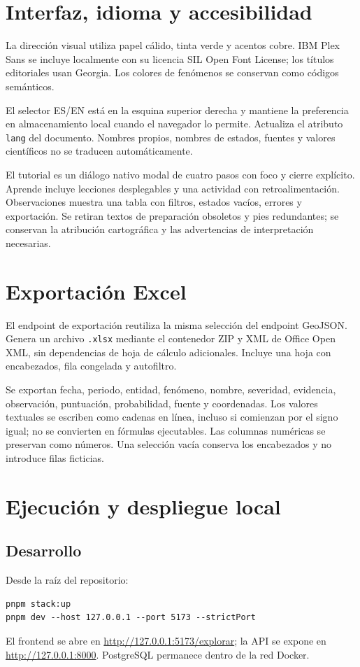 \documentclass[11pt,a4paper]{article}
\begin{document}
\section{Interfaz, idioma y accesibilidad}
La dirección visual utiliza papel cálido, tinta verde y acentos cobre. IBM Plex Sans se incluye localmente con su licencia SIL Open Font License; los títulos editoriales usan Georgia. Los colores de fenómenos se conservan como códigos semánticos.

El selector ES/EN está en la esquina superior derecha y mantiene la preferencia en almacenamiento local cuando el navegador lo permite. Actualiza el atributo \texttt{lang} del documento. Nombres propios, nombres de estados, fuentes y valores científicos no se traducen automáticamente.

El tutorial es un diálogo nativo modal de cuatro pasos con foco y cierre explícito. Aprende incluye lecciones desplegables y una actividad con retroalimentación. Observaciones muestra una tabla con filtros, estados vacíos, errores y exportación. Se retiran textos de preparación obsoletos y pies redundantes; se conservan la atribución cartográfica y las advertencias de interpretación necesarias.

\section{Exportación Excel}
El endpoint de exportación reutiliza la misma selección del endpoint GeoJSON. Genera un archivo \texttt{.xlsx} mediante el contenedor ZIP y XML de Office Open XML, sin dependencias de hoja de cálculo adicionales. Incluye una hoja con encabezados, fila congelada y autofiltro.

Se exportan fecha, periodo, entidad, fenómeno, nombre, severidad, evidencia, observación, puntuación, probabilidad, fuente y coordenadas. Los valores textuales se escriben como cadenas en línea, incluso si comienzan por el signo igual; no se convierten en fórmulas ejecutables. Las columnas numéricas se preservan como números. Una selección vacía conserva los encabezados y no introduce filas ficticias.

\section{Ejecución y despliegue local}
\subsection{Desarrollo}
Desde la raíz del repositorio:
\begin{verbatim}
pnpm stack:up
pnpm dev --host 127.0.0.1 --port 5173 --strictPort
\end{verbatim}
El frontend se abre en \url{http://127.0.0.1:5173/explorar}; la API se expone en \url{http://127.0.0.1:8000}. PostgreSQL permanece dentro de la red Docker.
\end{document}
